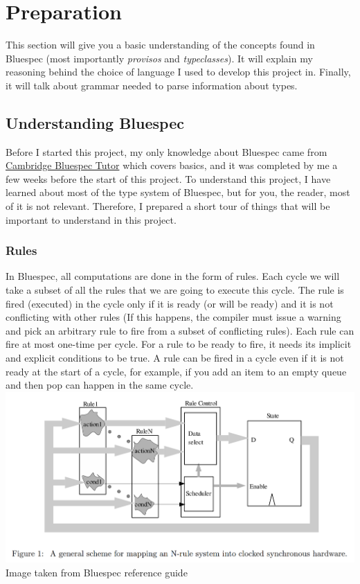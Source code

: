 \documentclass[12pt]{report}
\begin{document}
\chapter{Preparation}
This section will give you a basic understanding of the concepts found in Bluespec (most importantly \emph{provisos} and \emph{typeclasses}). It will explain my reasoning behind the choice of language I used to develop this project in. Finally, it will talk about grammar needed to parse information about types.
\section{Understanding Bluespec}
Before I started this project, my only knowledge about Bluespec came from \href{https://www-bluespec.cl.cam.ac.uk/}{Cambridge Bluespec Tutor} which covers basics, and it was completed by me a few weeks before the start of this project. To understand this project, I have learned about most of the type system of Bluespec, but for you, the reader, most of it is not relevant. Therefore, I prepared a short tour of things that will be important to understand in this project. 
\subsection{Rules}
In Bluespec, all computations are done in the form of rules.  
Each cycle we will take a subset of all the rules that we are going to execute this cycle. The rule is fired (executed) in the cycle only if it is ready (or will be ready) and it is not conflicting with other rules (If this happens, the compiler must issue a warning and pick an arbitrary rule to fire from a subset of conflicting rules). Each rule can fire at most one-time per cycle.  
For a rule to be ready to fire, it needs its implicit and explicit conditions to be true.  
A rule can be fired in a cycle even if it is not ready at the start of a cycle, for example, if you add an item to an empty queue and then pop can happen in the same cycle. \\ 
\includegraphics[width=\textwidth]{Rulemapping.png} 
Image taken from Bluespec reference guide \cite{BscReference} 
\end{document}
